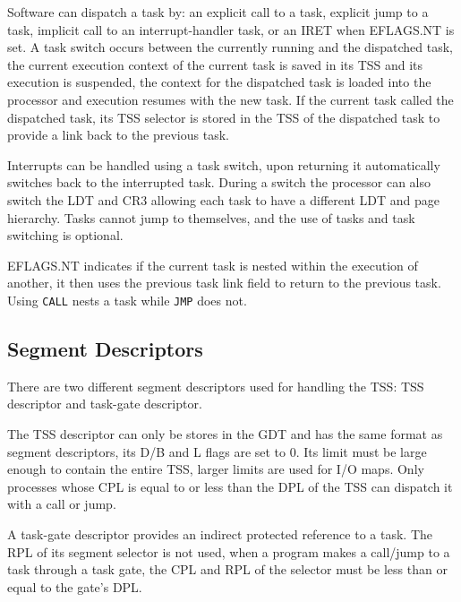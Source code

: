 \documentclass{article}
\newcommand{\layout}[1]{\parbox{\linewidth}{#1}}
\begin{document}
\layout{
  Software can dispatch a task by: an explicit call to a task, explicit jump to a task, implicit call to an interrupt-handler task, or an IRET when EFLAGS.NT is set.
  A task switch occurs between the currently running and the dispatched task, the current execution context of the current task is saved in its TSS and its execution is suspended, the context for the dispatched task is loaded into the processor and execution resumes with the new task.
  If the current task called the dispatched task, its TSS selector is stored in the TSS of the dispatched task to provide a link back to the previous task.

  \bigskip

  Interrupts can be handled using a task switch, upon returning it automatically switches back to the interrupted task.
  During a switch the processor can also switch the LDT and CR3 allowing each task to have a different LDT and page hierarchy.
  Tasks cannot jump to themselves, and the use of tasks and task switching is optional.

  \bigskip \cite[Chapter~9.1.3]{sdm3}
} \bigskip

\layout{
  EFLAGS.NT indicates if the current task is nested within the execution of another, it then uses the previous task link field to return to the previous task.
  Using \texttt{CALL} nests a task while \texttt{JMP} does not.

  \bigskip \cite[Chapter~9.4]{sdm3}
}

\layout{
  \subsection{Segment Descriptors}

  There are two different segment descriptors used for handling the TSS: TSS descriptor and task-gate descriptor.

  The TSS descriptor can only be stores in the GDT and has the same format as segment descriptors, its D/B and L flags are set to 0.
  Its limit must be large enough to contain the entire TSS, larger limits are used for I/O maps.
  Only processes whose CPL is equal to or less than the DPL of the TSS can dispatch it with a call or jump.

  \bigskip \cite[Chapter~9.2.2]{sdm3}
} \bigskip

\layout{
  A task-gate descriptor provides an indirect protected reference to a task.
  The RPL of its segment selector is not used, when a program makes a call/jump to a task through a task gate, the CPL and RPL of the selector must be less than or equal to the gate's DPL.
} \bigskip
\end{document}
